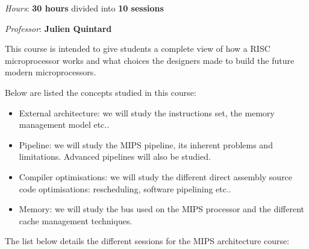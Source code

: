 {\begin{multicols}{2}
\textit{Hours}: \textbf{30 hours} divided into \textbf{10 sessions}

\textit{Professor}: \textbf{Julien Quintard}

This course is intended to give students a complete view of how a RISC
microprocessor works and what choices the designers made to build the
future modern microprocessors.

Below are listed the concepts studied in this course:

\begin{itemize}
  \item
    External architecture: we will study the instructions set,
    the memory management model etc..
  \item
    Pipeline: we will study the MIPS pipeline, its inherent problems
    and limitations. Advanced pipelines will also be studied.
  \item
    Compiler optimisations: we will study the different direct assembly
    source code optimisations: rescheduling, software pipelining etc..
  \item
    Memory: we will study the bus used on the MIPS processor and
    the different cache management techniques.
\end{itemize}

The list below details the different sessions for the MIPS architecture
course:


\end{multicols}}

